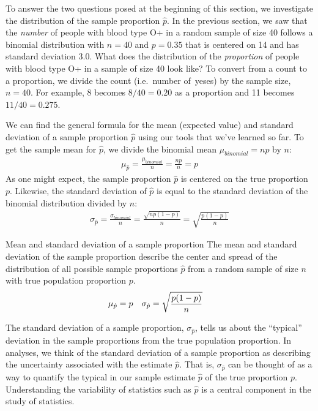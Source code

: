 To answer the two questions posed at the beginning of this section, we investigate the distribution of the sample proportion $\hat{p}$. In the previous section, we saw that the \emph{number} of people with blood type O+ in a random sample of size 40 follows a binomial distribution with $n=40$ and $p=0.35$ that is centered on 14 and has standard deviation 3.0. What does the distribution of the \emph{proportion} of people with blood type O+ in a sample of size 40 look like?  To convert from a count to a proportion, we divide the count (i.e.~number of~yeses) by the sample size, $n = 40$. For example, 8 becomes $8/40 = 0.20$ as a proportion and 11 becomes $11/40 = 0.275$. 

We can find the general formula for the mean (expected value) and standard deviation of a sample proportion $\hat{p}$ using our tools that we've learned so far. To get the sample mean for $\hat{p}$, we divide the binomial mean $\mu_{binomial} = np$ by $n$:
\begin{align*}
\mu_{\hat{p}} = \frac{\mu_{binomial}}{n} = \frac{np}{n} = p
\end{align*}
As one might expect, the sample proportion $\hat{p}$ is centered on the true proportion $p$. Likewise, the standard deviation of $\hat{p}$ is equal to the standard deviation of the binomial distribution divided by $n$:
\begin{align*}
\sigma_{\hat{p}}
	= \frac{\sigma_{binomial}}{n}
	= \frac{\sqrt{np(1-p)}}{n}
	= \sqrt{\frac{p(1-p)}{n}}
\end{align*}

\begin{onebox}{Mean and standard deviation of a sample proportion}
The mean and standard deviation of the sample proportion describe the center and spread of the distribution of all possible sample proportions $\hat{p}$ from a random sample of size $n$ with true population proportion $p$.
\begin{align*}
\mu_{\hat{p}} &= p
	& \sigma_{\hat{p}}&= \sqrt{\frac{p(1-p)}{n}}
	\vspace{1mm}
\end{align*}\end{onebox}


The standard deviation of a sample proportion, $\sigma_{\hat{p}}$, tells us about the ``typical'' deviation in the sample proportions from the true population proportion.  In analyses, we think of the standard deviation of a sample proportion as describing the uncertainty associated with the estimate $\hat{p}$. That is, $\sigma_{\hat{p}}$ can be thought of as a way to quantify the typical  in our sample estimate $\hat{p}$ of the true proportion $p$. Understanding the variability of statistics such as $\hat{p}$ is a central component in the study of statistics.

